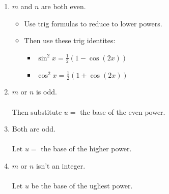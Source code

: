\documentclass{letter}
\begin{document}
	\begin{enumerate}
		\item $m$ and $n$ are both even.\\
		\begin{itemize}
			\item Use trig formulas to reduce to lower powers.
			\item Then use these trig identites:
			\begin{itemize}
				\item $\sin^2 x = \frac{1}{2}(1-\cos(2x))$
				\item$\cos^2 x = \frac{1}{2}(1 + \cos(2x))$
			\end{itemize}
		\end{itemize}
		
		\item $m$ or $n$ is odd.\\\\
		Then substitute $u = $ the base of the even power.
		
		\item Both are odd.\\\\
		Let $u = $ the base of the higher power.
		
		\item $m$ or $n$ isn't an integer.\\\\
		Let $u$ be the base of the ugliest power.
	\end{enumerate}
\end{document}
